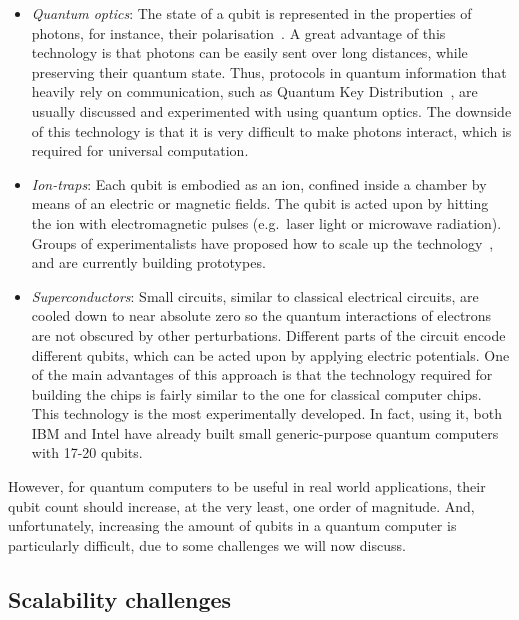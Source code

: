 \begin{itemize}

\item \textit{Quantum optics}: The state of a qubit is represented in the properties of photons, for instance, their polarisation~\citep{OpticsQC}. A great advantage of this technology is that photons can be easily sent over long distances, while preserving their quantum state. Thus, protocols in quantum information that heavily rely on communication, such as Quantum Key Distribution~\citep{QKD}, are usually discussed and experimented with using quantum optics. The downside of this technology is that it is very difficult to make photons interact, which is required for universal computation.

\item \textit{Ion-traps}: Each qubit is embodied as an ion, confined inside a chamber by means of an electric or magnetic fields. The qubit is acted upon by hitting the ion with electromagnetic pulses (e.g.\ laser light or microwave radiation). Groups of experimentalists have proposed how to scale up the technology~\citep{HensingerIonTraps}, and are currently building prototypes.

\item \textit{Superconductors}: Small circuits, similar to classical electrical circuits, are cooled down to near absolute zero so the quantum interactions of electrons are not obscured by other perturbations. Different parts of the circuit encode different qubits, which can be acted upon by applying electric potentials. One of the main advantages of this approach is that the technology required for building the chips is fairly similar to the one for classical computer chips. This technology is the most experimentally developed. In fact, using it, both IBM and Intel have already built small generic-purpose quantum computers with 17-20 qubits.

\end{itemize}

However, for quantum computers to be useful in real world applications, their qubit count should increase, at the very least, one order of magnitude. And, unfortunately, increasing the amount of qubits in a quantum computer is particularly difficult, due to some challenges we will now discuss.


\subsection{Scalability challenges}
\label{Challenges}


